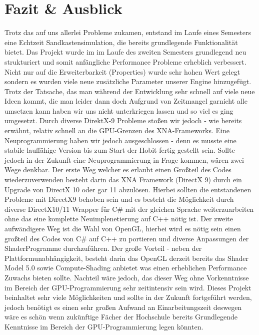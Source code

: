 \chapter{Fazit \& Ausblick}

\begin{Spacing}{\mylinespace}
Trotz das auf uns allerlei Probleme zukamen, entstand im Laufe eines Semesters eine Echtzeit Sandkastensimulation, die bereits grundlegende Funktionalität bietet. 
Das Projekt wurde im  im Laufe des zweiten Semesters grundlegend neu strukturiert und somit anfängliche Performance Probleme erheblich verbessert.
Nicht nur auf die Erweiterbarkeit (Properties) wurde sehr hohen Wert gelegt sondern es wurden viele neue zusätzliche Parameter unserer Engine hinzugefügt.
Trotz der Tatsache, das man während der Entwicklung sehr schnell auf viele neue Ideen kommt, die man leider dann doch Aufgrund von Zeitmangel garnicht alle umsetzen kann haben wir uns nicht unterkriegen lassen und so viel es ging umgesetzt. Durch diverse DirektX-9 Probleme stoßen wir jedoch - wie bereits erwähnt, relativ schnell an die GPU-Grenzen des XNA-Frameworks.
Eine Neuprogrammierung haben wir jedoch ausgeschlossen - denn es musste eine stabile lauffähige Version bis zum Start der Hobit fertig gestellt sein.
Sollte jedoch in der Zukunft eine Neuprogrammierung in Frage kommen, wären zwei Wege denkbar.
Der erste Weg welcher es erlaubt einen Großteil des Codes wiederzuverwenden besteht darin das XNA Framework (DirectX 9) durch ein Upgrade von DirectX 10 oder gar 11 abzulösen.
Hierbei sollten die entstandenen Probleme mit DirectX9 behoben sein und es besteht die Möglichkeit durch diverse DirectX10/11 Wrapper für C\# mit der gleichen Sprache weiterzuarbeiten ohne das eine komplette Neuimplenetierung auf C++ nötig ist.
Der zweite aufwändigere Weg ist die Wahl von OpenGL, hierbei wird es nötig sein einen großteil des Codes von C\# auf C++ zu portieren und diverse Anpassungen der ShaderProgramme durchzuführen. Der große Vorteil - neben der Plattformunabhängigkeit, besteht darin das OpenGL derzeit bereits das Shader Model 5.0 sowie Compute-Shading anbietet was einen erheblichen Performance Zuwachs bieten sollte. Nachteil wäre jedoch, das dieser Weg ohne Vorkenntnisse im Bereich der GPU-Programmierung sehr zeitintensiv sein wird.
Dieses Projekt beinhaltet sehr viele Möglichkeiten und sollte in der Zukunft fortgeführt werden, jedoch benötigt es einen sehr großen Aufwand an Einarbeitungszeit deswegen wäre es schön wenn zukünftige Fächer der Hochschule bereits Grundlegende Kenntnisse im Bereich der GPU-Programmierung legen könnten.
	
\end{Spacing}
\newpage
\clearpage
